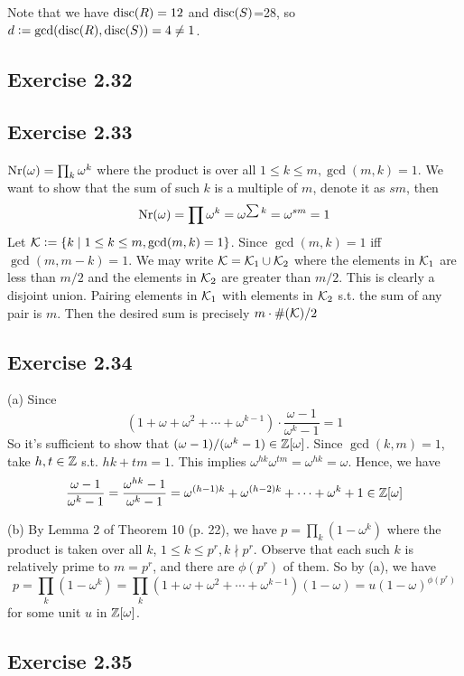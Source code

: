 \documentclass[../Marcus.tex]{subfiles}
\begin{document}
Note that we have $\operatorname{disc}(R)=12$ and $\operatorname{disc}(S)$=28, so $d:=\gcd(\operatorname{disc}(R),\operatorname{disc}(S))=4\neq1$.

\subsection*{Exercise 2.32}

\subsection*{Exercise 2.33}

$\operatorname{Nr}(\omega)=\prod_{k} \omega^k$ where the product is over all $1\leq k\leq m,\gcd(m,k)=1$. We want to show that the sum of such $k$ is a multiple of $m$, denote it as $sm$, then $$\operatorname{Nr}(\omega)=\prod \omega^k=\omega^{\sum k}=\omega^{sm}=1$$ Let $\mathcal{K}:=\{k\mid 1\leq k\leq m,\gcd(m,k)=1\}$. Since $\gcd(m,k)=1$ iff $\gcd(m,m-k)=1$. We may write $\mathcal{K}=\mathcal{K}_1\cup\mathcal{K}_2$ where the elements in $\mathcal{K}_1$ are less than $m/2$ and the elements in $\mathcal{K}_2$ are greater than $m/2$. This is clearly a disjoint union. Pairing elements in $\mathcal{K}_1$ with elements in $\mathcal{K}_2$ s.t. the sum of any pair is $m$. Then the desired sum is precisely $m\cdot\#(\mathcal{K})/2$

\subsection*{Exercise 2.34}

(a) Since $$\left(1+\omega+\omega^2+\cdots+\omega^{k-1}\right)\cdot\frac{\omega-1}{\omega^k-1}=1$$ So it's sufficient to show that $(\omega-1)/(\omega^k-1)\in\mathbb{Z}[\omega]$. Since $\gcd(k,m)=1$, take $h,t\in\mathbb{Z}$ s.t. $hk+tm=1$. This implies $\omega^{hk}\omega^{tm}=\omega^{hk}=\omega$. Hence, we have $$\frac{\omega-1}{\omega^k-1}=\frac{\omega^{hk}-1}{\omega^k-1}=\omega^{(h-1)k}+\omega^{(h-2)k}+\cdots+\omega^k+1\in\mathbb{Z}[\omega]$$

(b) By Lemma 2 of Theorem 10 (p. 22), we have $p=\prod_{k} (1-\omega^k)$ where the product is taken over all $k$, $1\leq k\leq p^r,k\nmid p^r$. Observe that each such $k$ is relatively prime to $m=p^r$, and there are $\phi(p^r)$ of them. So by (a), we have $$p=\prod_{k} (1-\omega^k)= \prod_{k}(1+\omega+\omega^2+\cdots+\omega^{k-1})(1-\omega)=u(1-\omega)^{\phi(p^r)}
$$
for some unit $u$ in $\mathbb{Z}[\omega]$.

\subsection*{Exercise 2.35}
\end{document}
